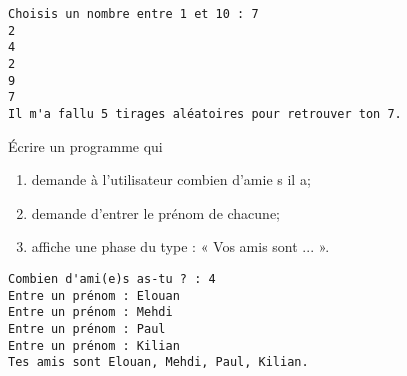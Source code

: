 \documentclass[a4paper,10pt,french]{article}
\begin{document}
\begin{exemple}[ ]
\begin{verbatim}
Choisis un nombre entre 1 et 10 : 7
2
4
2
9
7
Il m'a fallu 5 tirages aléatoires pour retrouver ton 7.
\end{verbatim}	
\end{exemple}

 \newpage
\'Ecrire un programme qui
\begin{enumerate}[--]
	\item 	demande à l'utilisateur combien d'ami\cdot  e \cdot s il a;
	\item 	demande d'entrer le prénom de chacun\cdot e;
	\item 	affiche une phase du type : « Vos amis sont ... ».
\end{enumerate}

\begin{exemple}[ ]
	\begin{verbatim}
Combien d'ami(e)s as-tu ? : 4
Entre un prénom : Elouan
Entre un prénom : Mehdi
Entre un prénom : Paul
Entre un prénom : Kilian
Tes amis sont Elouan, Mehdi, Paul, Kilian.
\end{verbatim}	
\end{exemple}

\end{document}
